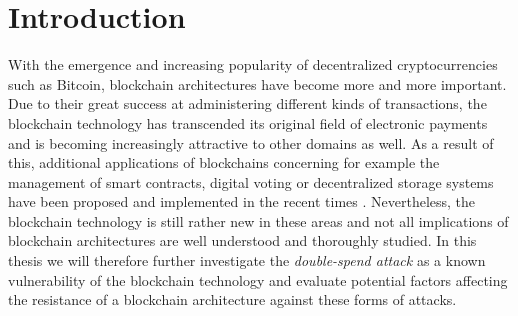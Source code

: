 \documentclass[a4paper,12pt,twoside]{report}
\begin{document}
\clearpage



\tableofcontents
\clearpage

\clearpage

\begin{acronym}
\end{acronym}


\fancyhead{}
\pagestyle{fancy}
\fancyhead[LE]{\slshape \leftmark}
\fancyhead[RO]{\slshape \rightmark}
\headheight=15pt





\chapter{Introduction}\label{intro}
With the emergence and increasing popularity of decentralized cryptocurrencies such as Bitcoin, blockchain architectures have become more and more important. Due to their great success at administering different kinds of transactions, the blockchain technology has transcended its original field of electronic payments and is becoming increasingly attractive to other domains as well. As a result of this, additional applications of blockchains concerning for example the management of smart contracts, digital voting or decentralized storage systems have been proposed and implemented in the recent times \cite{apps1,apps2}. Nevertheless, the blockchain technology is still rather new in these areas and not all implications of blockchain architectures are well understood and thoroughly studied. In this thesis we will therefore further investigate the \textit{double-spend attack} as a known vulnerability of the blockchain technology and evaluate potential factors affecting the resistance of a blockchain architecture against these forms of attacks.
\end{document}
